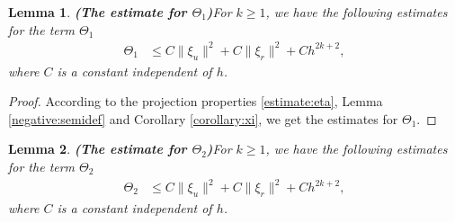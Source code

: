 \documentclass[11pt]{article}
\newtheorem{lemma}{Lemma}[section]
\numberwithin{equation}{section}
\begin{document}
\begin{lemma} {\bf{(The estimate for $\Theta_1$)}}\label{lemma:estimate1}
For $k\geq1$, we have the following estimates for the term $\Theta_1$
{
\begin{align}
\Theta_1&\leq C\|\xi_u\|^2+C\|\xi_r\|^2+Ch^{2k+2},\label{eq:est:theta1}
\end{align}
}
where $C$ is a constant independent of $h$.
\end{lemma}
\begin{proof}
According to the projection properties \eqref{estimate:eta}, Lemma \ref{negative:semidef} and Corollary \ref{corollary:xi}, we get the estimates for $\Theta_1$.
\end{proof}
\begin{lemma} {\bf{(The estimate for $\Theta_2$)}}\label{lemma:estimate2}
For $k\geq1$, we have the following estimates for the term $\Theta_2$
{
\begin{align}
\Theta_2&\leq C\|\xi_u\|^2+C\|\xi_r\|^2+Ch^{2k+2},\label{eq:est:theta2}
\end{align}
}
where $C$ is a constant independent of $h$.
\end{lemma}
\end{document}
